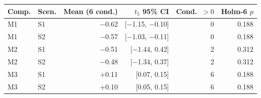 \begin{tabular}{@{}llrrrr@{}}
\toprule
Comp. & Scen. & Mean (6 cond.) & $t_5$ 95\% CI & Cond.\ $>0$ & Holm-6 $p$ \\
\midrule
M1 & S1 & $-$0.62 & [$-$1.15, $-$0.10] & 0 & 0.188 \\
M1 & S2 & $-$0.57 & [$-$1.03, $-$0.11] & 0 & 0.188 \\
M2 & S1 & $-$0.51 & [$-$1.44, 0.42] & 2 & 0.312 \\
M2 & S2 & $-$0.48 & [$-$1.34, 0.37] & 2 & 0.312 \\
M3 & S1 & +0.11 & [0.07, 0.15] & 6 & 0.188 \\
M3 & S2 & +0.10 & [0.05, 0.15] & 6 & 0.188 \\
\bottomrule
\end{tabular}
